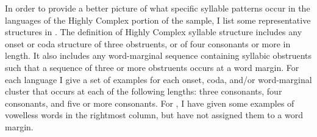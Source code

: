   In order to provide a better picture of what specific syllable patterns occur in the languages of the Highly Complex portion of the sample, I list some representative structures in . The definition of Highly Complex syllable structure includes any onset or coda structure of three obstruents, or of four consonants or more in length. It also includes any word-marginal sequence containing syllabic obstruents such that a sequence of three or more obstruents occurs at a word margin. For each language I give a set of examples for each onset, coda, and/or word-marginal cluster that occurs at each of the following lengths: three consonants, four consonants, and five or more consonants. For , I have given some examples of vowelless words in the rightmost column, but have not assigned them to a word margin.

